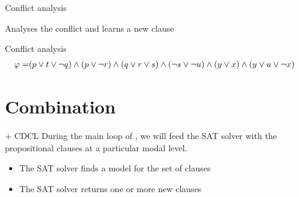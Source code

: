 \documentclass[10pt]{beamer}
\begin{document}
\begin{frame}{Conflict analysis}
    \begin{center}
        Analyses the conflict and learns a new clause
    \end{center}
\end{frame}

\begin{frame}{Conflict analysis}
    \begin{align*}
        \varphi = &(p \lor t \lor \neg q) \land (p \lor \neg r) \land (q \lor r \lor s) \land (\neg s \lor \neg u) \land (y \lor x) \land (y \lor u \lor \neg x)
    \end{align*}

    
\end{frame}

\section{Combination}
\begin{frame}{\ksp + CDCL}
    During the main loop of \ksp, we will feed the SAT solver with the
    propositional clauses at a particular modal level.

    \begin{itemize}[<+- | visible@+(1)->]
        \item The SAT solver finds a model for the set of clauses
        \item The SAT solver returns one or more new clauses
    \end{itemize}
\end{frame}
\end{document}

